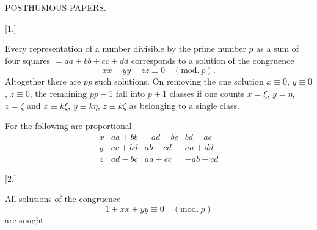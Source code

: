 \begin{center}
{\Large POSTHUMOUS PAPERS.\par}
\]
\end{center}
\begin{center}[1.]\end{center}
\noindent\hspace*{\parindent}Every representation of a number divisible by the prime number $p$ as a sum of four squares $=aa+bb+cc+dd$ corresponds to a solution of the congruence
\[
xx+yy+zz\equiv 0\quad(\mathrm{mod.}\ p).
\]
\noindent Altogether there are $pp$ such solutions. On removing the one solution $x\equiv0$, $y\equiv0$, $z\equiv0$, the remaining $pp-1$ fall into $p+1$ classes if one counts $x=\xi$, $y=\eta$, $z=\zeta$ and $x\equiv k\xi$, $y\equiv k\eta$, $z\equiv k\zeta$ as belonging to a single class.

For the following are proportional
\[
\begin{array}{c|c|c|c}
x & aa+bb & -ad-bc & bd-ac\\
y & ac+bd & ab-cd & aa+dd\\
z & ad-bc & aa+cc & -ab-cd
\end{array}
\]
\begin{center}[2.]\end{center}
\noindent\hspace*{\parindent}All solutions of the congruence
\[
1+xx+yy\equiv0\quad(\mathrm{mod.}\ p)
\]
\noindent are sought.
\clearpage
